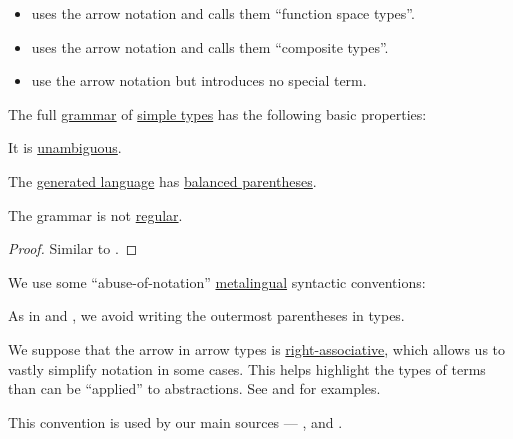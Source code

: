 \begin{remark}
\begin{itemize}
    \item {} uses the arrow notation and calls them \enquote{function space types}.

    \item {} uses the arrow notation and calls them \enquote{composite types}.

    \item {} use the arrow notation but introduces no special term.
  \end{itemize}
\end{remark}

\begin{proposition}\label{thm:simple_type_grammar}
  The full \hyperref[def:formal_grammar]{grammar} of \hyperref[def:simple_type]{simple types} has the following basic properties:
  \begin{thmenum}
     It is \hyperref[def:grammar_ambiguity]{unambiguous}.

     The \hyperref[def:formal_grammar/language]{generated language} has \hyperref[def:paired_delimiters]{balanced parentheses}.

     The grammar is not \hyperref[def:chomsky_hierarchy/regular]{regular}.
  \end{thmenum}
\end{proposition}
\begin{proof}
  Similar to .
\end{proof}

\begin{remark}\label{rem:simple_type_parentheses}
  We use some \enquote{abuse-of-notation} \hyperref[con:metalogic]{metalingual} syntactic conventions:
  \begin{thmenum}
     As in  and , we avoid writing the outermost parentheses in types.

     We suppose that the arrow in arrow types is \hyperref[rem:binary_operation_syntax_trees/associativity]{right-associative}, which allows us to vastly simplify notation in some cases. This helps highlight the types of terms than can be \enquote{applied} to abstractions. See  and  for examples.

    This convention is used by our main sources --- ,  and .
  \end{thmenum}
\end{remark}

